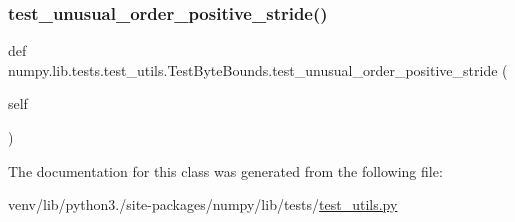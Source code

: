 \subsubsection{\texorpdfstring{test\+\_\+unusual\+\_\+order\+\_\+positive\+\_\+stride()}{test\_unusual\_order\_positive\_stride()}}
{\footnotesize\ttfamily def numpy.\+lib.\+tests.\+test\+\_\+utils.\+Test\+Byte\+Bounds.\+test\+\_\+unusual\+\_\+order\+\_\+positive\+\_\+stride (\begin{DoxyParamCaption}\item[{}]{self }\end{DoxyParamCaption})}



The documentation for this class was generated from the following file\+:\begin{DoxyCompactItemize}
\item 
venv/lib/python3./site-\/packages/numpy/lib/tests/\hyperlink{numpy_2lib_2tests_2test__utils_8py}{test\+\_\+utils.\+py}\end{DoxyCompactItemize}
